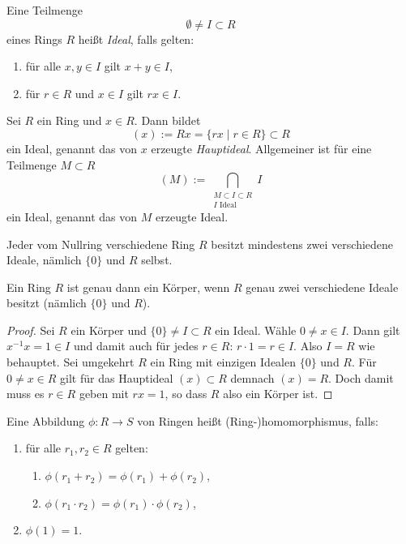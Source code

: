 \documentclass{book}
\begin{document}
\begin{defi}
    \label{defi:ideal}
    Eine Teilmenge
    \[
        \emptyset \ne I \subset R
    \]
    eines Rings $R$ heißt {\em Ideal}, falls gelten:
    \begin{enumerate}
        \item für alle $x,y \in I$ gilt $x + y \in I$,
        \item für $r \in R$ und $x \in I$ gilt $rx \in I$. 
    \end{enumerate}
\end{defi}

\begin{exa}
    \label{exa:hauptideal}
    Sei $R$ ein Ring und $x \in R$. Dann bildet
    \[
        (x) := Rx = \{ rx \; | \; r \in R \} \subset R
    \] 
    ein Ideal, genannt das von $x$ erzeugte \emph{Hauptideal}. Allgemeiner ist für eine Teilmenge $M \subset R$
    \[
        (M) := \bigcap_{\substack{M \subset I \subset R\\\text{$I$ Ideal}}} I
    \] 
    ein Ideal, genannt das von $M$ erzeugte Ideal. 
\end{exa}

Jeder vom Nullring verschiedene Ring $R$ besitzt mindestens zwei verschiedene
Ideale, nämlich $\{0\}$ und $R$ selbst. 

\begin{prop}
    \label{prop:koerper}
    Ein Ring $R$ ist genau dann ein Körper, wenn $R$ genau zwei verschiedene
    Ideale besitzt (nämlich $\{0\}$ und $R$).
\end{prop}
\begin{proof}
    Sei $R$ ein Körper und $\{0\} \ne I \subset R$ ein Ideal. Wähle $0 \ne x
    \in I$. Dann gilt $x^{-1} x = 1 \in I$ und damit auch für jedes $r \in R$:
    $r \cdot 1 = r \in I$. Also $I = R$ wie behauptet. Sei umgekehrt $R$ ein
    Ring mit einzigen Idealen $\{0\}$ und $R$. Für $0 \ne x \in R$ gilt für das
    Hauptideal $(x) \subset R$ demnach $(x) = R$. Doch damit muss es $r \in R$
    geben mit $r x = 1$, so dass $R$ also ein Körper ist. 
\end{proof}

\begin{defi}
    \label{defi:rhom}
    Eine Abbildung $\phi: R \to S$ von Ringen heißt (Ring-)homomorphismus, falls:
    \begin{enumerate}
        \item für alle $r_1,r_2 \in R$ gelten:
            \begin{enumerate}
                \item $\phi(r_1 + r_2) = \phi(r_1) + \phi(r_2)$,
                \item $\phi(r_1 \cdot r_2) = \phi(r_1) \cdot \phi(r_2)$,
            \end{enumerate}
        \item $\phi(1) = 1$. 
    \end{enumerate}
\end{defi}
\end{document}
